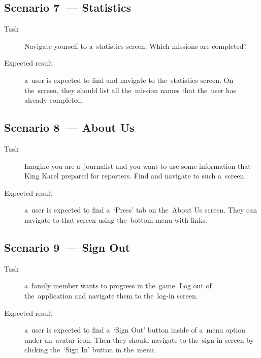 \subsection*{Scenario 7~--- Statistics}

\begin{description}
    \item[Task] Navigate yourself to a~statistics screen.
    Which missions are completed?
    \item[Expected result] a~user is expected to
    find and navigate to the~statistics screen.
    On the~screen,
    they should list all the~mission names that the~user has already completed.
\end{description}

\subsection*{Scenario 8~--- About Us}

\begin{description}
    \item[Task] Imagine you are a~journalist
    and you want to use some information
    that King Karel prepared for reporters.
    Find and navigate to such a~screen.
    \item[Expected result] a~user is expected to
    find a~\enquote*{Press} tab on the~About Us screen.
    They can navigate to that screen using the~bottom menu with links.
\end{description}

\subsection*{Scenario 9~--- Sign Out}

\begin{description}
    \item[Task] a~family member wants to progress in the~game.
    Log out of the~application
    and navigate them to the~log-in screen.
    \item[Expected result] a~user is expected to
    find a~\enquote*{Sign Out} button inside of a~menu option under an~avatar icon.
    Then they should navigate to the~sign-in screen
    by clicking the~\enquote*{Sign In} button in the~menu.    
\end{description}
